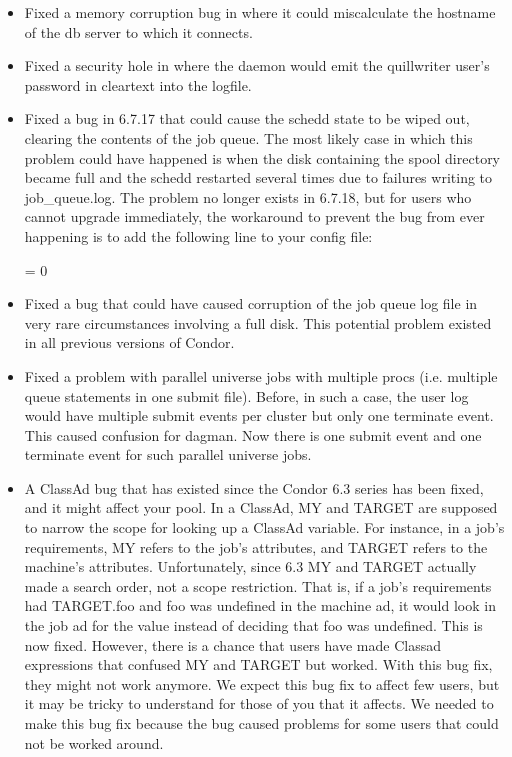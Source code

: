 \begin{itemize}

\item Fixed a memory corruption bug in  where it could
miscalculate the hostname of the db server to which it connects.

\item Fixed a security hole in  where the daemon would
emit the quillwriter user's password in cleartext into the 
logfile.

\item Fixed a bug in 6.7.17 that could cause the schedd state to be
wiped out, clearing the contents of the job queue.  The most likely
case in which this problem could have happened is when the disk
containing the spool directory became full and the schedd restarted
several times due to failures writing to job\_queue.log.  The problem
no longer exists in 6.7.18, but for users who cannot upgrade
immediately, the workaround to prevent the bug from ever happening is
to add the following line to your config file:

 = 0

\item Fixed a bug that could have caused corruption of the job queue
log file in very rare circumstances involving a full disk.  This
potential problem existed in all previous versions of Condor.

\item Fixed a problem with parallel universe jobs with multiple
procs (i.e. multiple queue statements in one submit file).
Before, in such a case, the user log would have multiple
submit events per cluster but only one terminate event.  This caused
confusion for dagman.  Now there is one submit event and one terminate
event for such parallel universe jobs.

\item A ClassAd bug that has existed since the Condor 6.3 series has
been fixed, and it might affect your pool. In a ClassAd, MY and TARGET
are supposed to narrow the scope for looking up a ClassAd
variable. For instance, in a job's requirements, MY refers to the
job's attributes, and TARGET refers to the machine's
attributes. Unfortunately, since 6.3 MY and TARGET actually made a
search order, not a scope restriction. That is, if a job's requirements
had TARGET.foo and foo was undefined in the machine ad, it would look
in the job ad for the value instead of deciding that foo was
undefined. This is now fixed. However, there is a chance that users
have made Classad expressions that confused MY and TARGET but
worked. With this bug fix, they might not work anymore. We expect this
bug fix to affect few users, but it may be tricky to understand for
those of you that it affects. We needed to make this bug fix because
the bug caused problems for some users that could not be worked
around.


\end{itemize}
